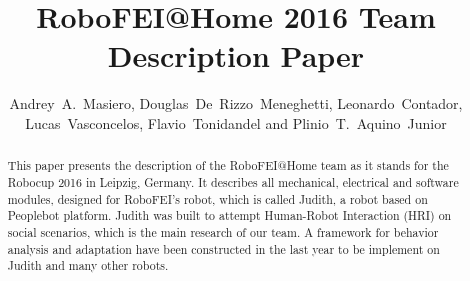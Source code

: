 \documentclass[runningheads,a4paper]{llncs}
\begin{document}
\title{RoboFEI@Home 2016 Team Description Paper}
\author{Andrey~A.~Masiero, Douglas~De~Rizzo~Meneghetti, Leonardo~Contador, Lucas~Vasconcelos, Flavio~Tonidandel and Plinio~T.~Aquino~Junior}

\maketitle


\begin{abstract}
This paper presents the description of the RoboFEI@Home team as it stands for the Robocup 2016 in Leipzig, Germany. It describes all mechanical, electrical and software modules, designed for RoboFEI's robot, which is called Judith, a robot based on Peoplebot platform. Judith was built to attempt Human-Robot Interaction (HRI) on social scenarios, which is the main research of our team. A framework for behavior analysis and adaptation have been constructed in the last year to be implement on Judith and many other robots.
\end{abstract}









\end{document}
